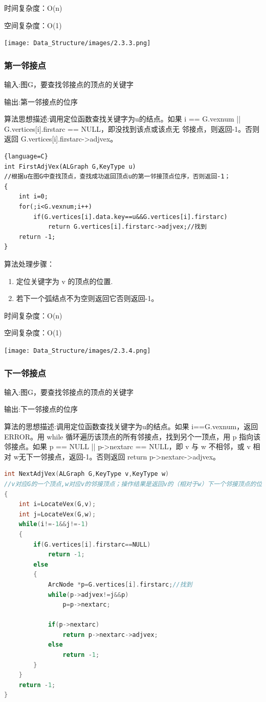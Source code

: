 \documentclass[supercite]{Experimental_Report}
\theoremstyle{definition}
\begin{document}
时间复杂度：O(n)

空间复杂度：O(1)

\texttt{[image: Data\_Structure/images/2.3.3.png]}
\vspace{-0.2cm}
\subsubsection{第一邻接点}

输入:图G，要查找邻接点的顶点的关键字

输出:第一邻接点的位序

算法思想描述:调用定位函数查找关键字为u的结点。如果 i == G.vexnum || G.vertices[i].firstarc == NULL，即没找到该点或该点无
邻接点，则返回-1。否则返回 G.vertices[i].firstarc->adjvex。
\begin{lstlisting}{language=C}
int FirstAdjVex(ALGraph G,KeyType u)
//根据u在图G中查找顶点，查找成功返回顶点u的第一邻接顶点位序，否则返回-1；
{
    int i=0;
    for(;i<G.vexnum;i++)
        if(G.vertices[i].data.key==u&&G.vertices[i].firstarc) 
            return G.vertices[i].firstarc->adjvex;//找到
    return -1;
}

\end{lstlisting}
算法处理步骤：
\begin{enumerate}
	\renewcommand{\labelenumi}{\theenumi)}
	\item 定位关键字为 v 的顶点的位置.
	\item 若下一个弧结点不为空则返回它否则返回-1。
\end{enumerate}

时间复杂度：O(n)

空间复杂度：O(1)

\texttt{[image: Data\_Structure/images/2.3.4.png]}
\vspace{-0.2cm}
\subsubsection{下一邻接点}
输入:图G，要查找邻接点的顶点的关键字

输出:下一邻接点的位序

算法的思想描述:调用定位函数查找关键字为u的结点。如果 i==G.vexnum，返回ERROR。用 while 循环遍历该顶点的所有邻接点，找到另个一顶点，用 p 指向该邻接点。如果 p == NULL || p->nextarc == NULL，即 v 与 w 不相邻，或 v 相对 w无下一邻接点，返回-1。否则返回 return p->nextarc->adjvex。

\begin{lstlisting}[language=C] 
int NextAdjVex(ALGraph G,KeyType v,KeyType w)
//v对应G的一个顶点,w对应v的邻接顶点；操作结果是返回v的（相对于w）下一个邻接顶点的位序；如果w是最后一个邻接顶点，或v、w对应顶点不存在，则返回-1。
{
    int i=LocateVex(G,v);
    int j=LocateVex(G,w);
    while(i!=-1&&j!=-1)
    {
        if(G.vertices[i].firstarc==NULL) 
            return -1;
        else
        {
            ArcNode *p=G.vertices[i].firstarc;//找到
            while(p->adjvex!=j&&p)
                p=p->nextarc;
            
            if(p->nextarc)
                return p->nextarc->adjvex;
            else 
                return -1;
        }
    }
    return -1;
}
\end{lstlisting}
\end{document}
